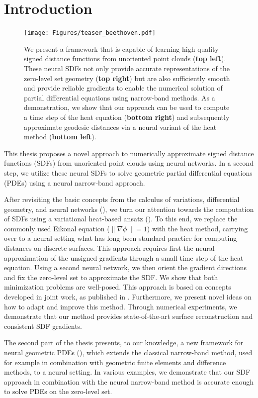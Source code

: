 \documentclass[draft,12pt,openany]{book}
\theoremstyle{plainnormal}
\theoremstyle{remark}
\begin{document}
\section{Introduction}
\begin{figure}
    \centering
    \texttt{[image: Figures/teaser\_beethoven.pdf]}
    \caption{We present a framework that is capable of learning high-quality signed distance functions from unoriented point clouds (\textbf{top left}). These neural SDFs not only provide accurate representations of the zero-level set geometry (\textbf{top right}) but are also sufficiently smooth and provide reliable gradients to enable the numerical solution of partial differential equations using narrow-band methods. As a demonstration, we show that our approach can be used to compute a time step of the heat equation (\textbf{bottom right}) and subsequently approximate geodesic distances via a neural variant of the heat method (\textbf{bottom left}). }
    \label{teaser}
\end{figure}
This thesis proposes a novel approach to numerically approximate signed distance functions (SDFs) from unoriented point clouds using neural networks. In a second step, we utilize these neural SDFs to solve geometric partial differential equations (PDEs) using a neural narrow-band approach.\par
After revisiting the basic concepts from the calculus of variations, differential geometry, and neural networks (), we turn our attention towards the computation of SDFs using a variational heat-based ansatz (). To this end, we replace the commonly used Eikonal equation ($\|\nabla \phi\| = 1$) with the heat method, carrying over to a neural setting what has long been standard practice for computing distances on discrete surfaces. This approach requires first the neural approximation of the unsigned gradients through a small time step of the heat equation. Using a second neural network, we then orient the gradient directions and fix the zero-level set to approximate the SDF. We show that both minimization problems are well-posed. This approach is based on concepts developed in joint work, as published in \cite{weidemaier2025sdfsunorientedpointclouds}. Furthermore, we present novel ideas on how to adapt and improve this method. Through numerical experiments, we demonstrate that our method provides state-of-the-art surface reconstruction and consistent SDF gradients.\par
The second part of the thesis presents, to our knowledge, a new framework for neural geometric PDEs (), which extends the classical narrow-band method, used for example in combination with geometric finite elements and difference methods, to a neural setting. In various examples, we demonstrate that our SDF approach in combination with the neural narrow-band method is accurate enough to solve PDEs on the zero-level set.
\end{document}
